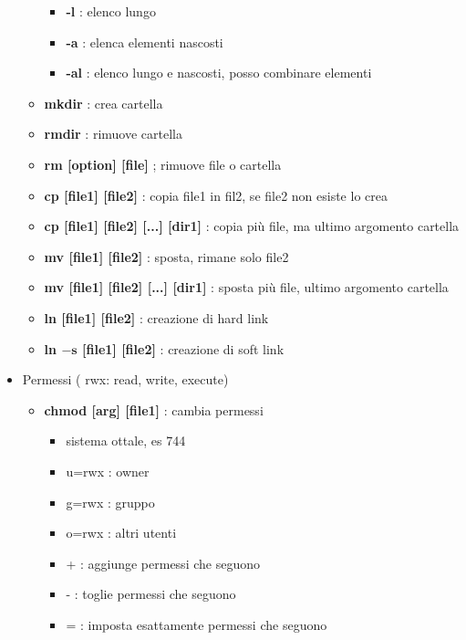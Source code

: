 \documentclass{article}
\begin{document}
\begin{itemize}
\begin{itemize}
            \begin{itemize} %
            
                \item \textbf{-l} : elenco lungo
                \item \textbf{-a} : elenca elementi nascosti
                \item \textbf{-al} : elenco lungo e nascosti, posso combinare elementi 
                
            \end{itemize} %
            
            \item \textbf{mkdir} : crea cartella
            \item \textbf{rmdir} : rimuove cartella
            \item \textbf{rm [option] [file]} ; rimuove file o cartella
            \item \textbf{cp [file1] [file2]} : copia file1 in fil2, se file2 non esiste lo crea
            \item \textbf{cp [file1] [file2] [...] [dir1]} : copia più file, ma ultimo argomento cartella
            \item \textbf{mv [file1] [file2] } : sposta, rimane solo file2
            \item \textbf{mv [file1] [file2] [...] [dir1]} : sposta più file, ultimo argomento cartella
            \item \textbf{ln [file1] [file2]} : creazione di hard link
            \item \textbf{ln $\mathbf{-s}$ [file1] [file2] }: creazione di soft link
            
        \end{itemize} %
        \newpage
        
    \item Permessi ( rwx: read, write, execute) 
        \begin{itemize} %
            \item \textbf{chmod [arg] [file1]} : cambia permessi 
                \begin{itemize} %
                    \item sistema ottale, es 744
                    \item u=rwx : owner
                    \item g=rwx : gruppo
                    \item o=rwx : altri utenti
                    \item + : aggiunge permessi che seguono
                    \item - : toglie permessi che seguono
                    \item = : imposta esattamente permessi che seguono
                \end{itemize} %
        \end{itemize} %
    

\end{itemize}
\end{document}
